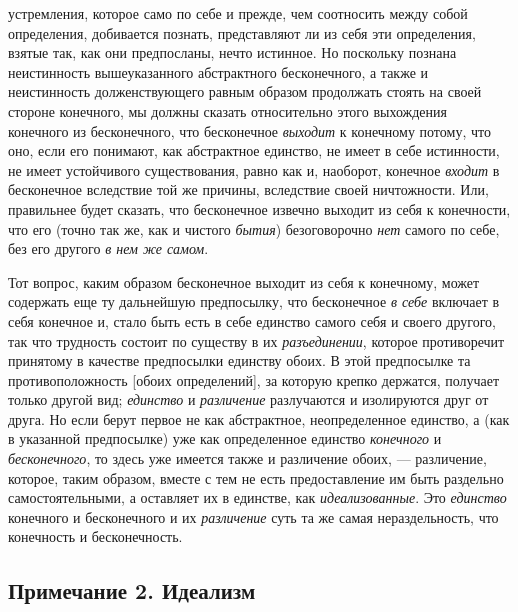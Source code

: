 устремления, которое само по себе и прежде, чем соотносить между собой
определения, добивается познать, представляют ли из себя эти определения,
взятые так, как они предпосланы, нечто истинное. Но поскольку познана
неистинность вышеуказанного абстрактного бесконечного, а также и
неистинность долженствующего равным образом продолжать стоять на своей
стороне конечного, мы должны сказать относительно этого выхождения
конечного из бесконечного, что бесконечное
{\em выходит} к конечному потому, что оно, если его
понимают, как абстрактное единство, не имеет в себе истинности, не имеет
устойчивого существования, равно как и, наоборот, конечное
{\em входит} в бесконечное вследствие той же причины,
вследствие своей ничтожности. Или, правильнее будет сказать, что
бесконечное извечно выходит из себя к конечности, что его (точно так же,
как и чистого {\em бытия}) безоговорочно
{\em нет} самого по себе, без его другого
{\em в нем же самом}.

Тот вопрос, каким образом бесконечное выходит из себя к конечному, может
содержать еще ту дальнейшую предпосылку, что бесконечное
{\em в себе} включает в себя конечное и, стало быть
есть в себе единство самого себя и своего другого, так что трудность
состоит по существу в их {\em разъединении}, которое
противоречит принятому в качестве предпосылки единству обоих. В этой
предпосылке та противоположность [обоих определений], за которую крепко
держатся, получает только другой вид; {\em единство} и
{\em различение} разлучаются и изолируются друг от
друга. Но если берут первое не как абстрактное, неопределенное единство, а
(как в указанной предпосылке) уже как определенное единство
{\em конечного} и
{\em бесконечного}, то здесь уже имеется также и
различение обоих, — различение, которое, таким образом, вместе с тем не
есть предоставление им быть раздельно самостоятельными, а оставляет их в
единстве, как {\em идеализованные}. Это
{\em единство} конечного и бесконечного и их
{\em различение} суть та же самая нераздельность, что
конечность и бесконечность.

\subsection*{Примечание 2. Идеализм}

